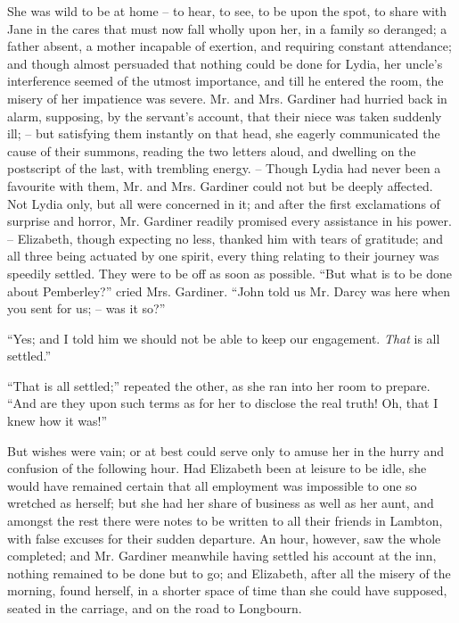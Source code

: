 She was wild to be at home -- to hear, to see, to be
upon the spot, to share with Jane in the cares that must
now fall wholly upon her, in a family so deranged; a father
absent, a mother incapable of exertion, and requiring
constant attendance; and though almost persuaded that
nothing could be done for Lydia, her uncle’s interference
seemed of the utmost importance, and till he entered the
room, the misery of her impatience was severe. Mr. and
Mrs. Gardiner had hurried back in alarm, supposing, by
the servant’s account, that their niece was taken suddenly
ill; -- but satisfying them instantly on that head, she
eagerly communicated the cause of their summons,
reading the two letters aloud, and dwelling on the postscript
of the last, with trembling energy. -- Though Lydia
had never been a favourite with them, Mr. and Mrs.
Gardiner could not but be deeply affected. Not Lydia
only, but all were concerned in it; and after the first
exclamations of surprise and horror, Mr. Gardiner readily
promised every assistance in his power. -- Elizabeth,
though expecting no less, thanked him with tears of
gratitude; and all three being actuated by one spirit,
every thing relating to their journey was speedily settled.
They were to be off as soon as possible. “But what is
to be done about Pemberley?” cried Mrs. Gardiner.
“John told us Mr. Darcy was here when you sent for
us; -- was it so?”

“Yes; and I told him we should not be able to keep
our engagement. \textit{That} is all settled.”

“That is all settled;” repeated the other, as she ran
into her room to prepare. “And are they upon such
terms as for her to disclose the real truth! Oh, that
I knew how it was!”

But wishes were vain; or at best could serve only to
amuse her in the hurry and confusion of the following
hour. Had Elizabeth been at leisure to be idle, she
would have remained certain that all employment was
impossible to one so wretched as herself; but she had
her share of business as well as her aunt, and amongst
the rest there were notes to be written to all their friends
in Lambton, with false excuses for their sudden departure.
An hour, however, saw the whole completed; and Mr.
Gardiner meanwhile having settled his account at the inn,
nothing remained to be done but to go; and Elizabeth,
after all the misery of the morning, found herself, in
a shorter space of time than she could have supposed,
seated in the carriage, and on the road to Longbourn.

